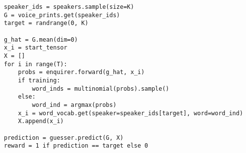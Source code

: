\begin{verbatim}
speaker_ids = speakers.sample(size=K)
G = voice_prints.get(speaker_ids)
target = randrange(0, K)

g_hat = G.mean(dim=0)
x_i = start_tensor
X = []
for i in range(T):
    probs = enquirer.forward(g_hat, x_i)
    if training:
        word_inds = multinomial(probs).sample()
    else:
        word_ind = argmax(probs)
    x_i = word_vocab.get(speaker=speaker_ids[target], word=word_ind)
    X.append(x_i)

prediction = guesser.predict(G, X)
reward = 1 if prediction == target else 0
\end{verbatim}